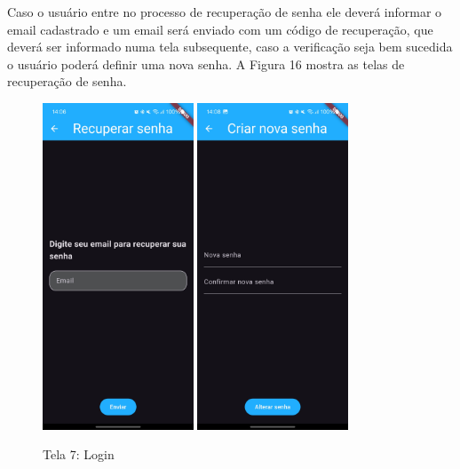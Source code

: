     Caso o usuário entre no processo de recuperação de senha ele deverá informar o email cadastrado e um email será enviado com um código de recuperação, que deverá ser informado numa tela subsequente, caso a verificação seja bem sucedida o usuário poderá definir uma nova senha. A Figura 16 mostra as telas de recuperação de senha.
    
    \FloatBarrier

    \begin{figure}[h]
        \centering
        \includegraphics[width=0.4\textwidth]{imagens/email.jpg} %
        \hspace{10mm}
        \includegraphics[width=0.4\textwidth]{imagens/nova-senha.jpg} %
        \caption{\scriptsize Tela 7: Login}
        \label{fig:tela7-recuperacao}
    \end{figure}

    \FloatBarrier